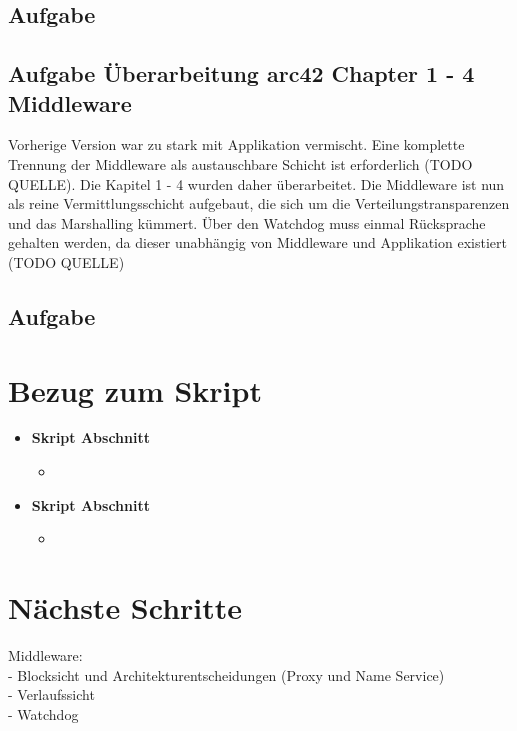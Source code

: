 \documentclass{article}
\begin{document}
\subsection{Aufgabe}


\subsection{Aufgabe Überarbeitung arc42 Chapter 1 - 4 Middleware}
Vorherige Version war zu stark mit Applikation vermischt. Eine komplette Trennung der Middleware als austauschbare Schicht ist erforderlich (TODO QUELLE). Die Kapitel 1 - 4 wurden daher überarbeitet. Die Middleware ist nun als reine Vermittlungsschicht aufgebaut, die sich um die Verteilungstransparenzen und das Marshalling kümmert. Über den Watchdog muss einmal Rücksprache gehalten werden, da dieser unabhängig von Middleware und Applikation existiert (TODO QUELLE) 

\subsection{Aufgabe}


\section{Bezug zum Skript}

\begin{itemize}
	\item \textbf{Skript Abschnitt}
		\begin{itemize}
			\item 
		\end{itemize}
	\item \textbf{Skript Abschnitt}
		\begin{itemize}
			\item 
		\end{itemize}
\end{itemize}
 
\section{Nächste Schritte}
Middleware:\\
- Blocksicht und Architekturentscheidungen (Proxy und Name Service)\\
- Verlaufssicht \\
- Watchdog \\
\end{document}

